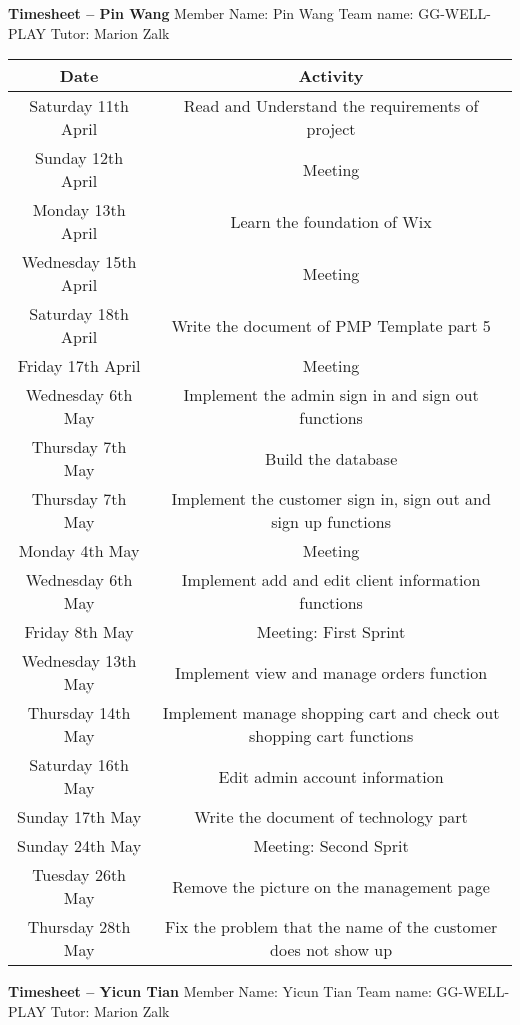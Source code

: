 \textbf{Timesheet – Pin Wang}
Member Name: Pin Wang
Team name: GG-WELL-PLAY
Tutor: Marion Zalk

\begin{tabular}{|c|c|}
\hline
Date & Activity\\
\hline
Saturday 11th April & Read and Understand the requirements of project\\
\hline
Sunday 12th April & Meeting\\
\hline
Monday 13th April & Learn the foundation of Wix\\
\hline
Wednesday 15th April & Meeting\\
\hline
Saturday 18th April & Write the document of PMP Template part 5\\
\hline
Friday 17th April & Meeting\\
\hline
Wednesday 6th May & Implement the admin sign in and sign out functions\\
\hline
Thursday 7th May & Build the database \\
\hline
Thursday 7th May & Implement the customer sign in, sign out and sign up functions \\
\hline
Monday 4th May & Meeting\\
\hline
Wednesday 6th May & Implement add and edit client information functions\\
\hline
Friday 8th May & Meeting: First Sprint\\
\hline
Wednesday 13th May & Implement view and manage orders function\\
\hline
Thursday 14th May & Implement manage shopping cart and check out shopping cart functions\\
\hline
Saturday 16th May & Edit admin account information\\
\hline
Sunday 17th May & Write the document of technology part\\
\hline
Sunday 24th May & Meeting: Second Sprit\\
\hline
Tuesday 26th May & Remove the picture on the management page\\
\hline
Thursday 28th May & Fix the problem that the name of the customer does not show up\\
\hline
\end{tabular}

\textbf{Timesheet – Yicun Tian}
Member Name: Yicun Tian
Team name: GG-WELL-PLAY
Tutor: Marion Zalk

